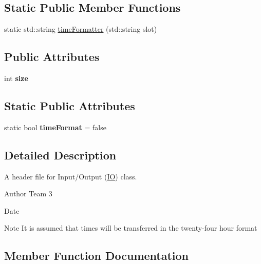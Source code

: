 \subsection*{Static Public Member Functions}
\begin{DoxyCompactItemize}
\item 
static std\+::string \hyperlink{classIO_ad78c42847c70915fe94bddd25f716859}{time\+Formatter} (std\+::string slot)
\end{DoxyCompactItemize}
\subsection*{Public Attributes}
\begin{DoxyCompactItemize}
\item 
int {\bfseries size}\hypertarget{classIO_a4e344c74454e6609b817e3fdb3fcddf3}{}\label{classIO_a4e344c74454e6609b817e3fdb3fcddf3}

\end{DoxyCompactItemize}
\subsection*{Static Public Attributes}
\begin{DoxyCompactItemize}
\item 
static bool {\bfseries time\+Format} = false\hypertarget{classIO_a04cf024687a6a86007db5ecfcab69e5c}{}\label{classIO_a04cf024687a6a86007db5ecfcab69e5c}

\end{DoxyCompactItemize}


\subsection{Detailed Description}
A header file for Input/\+Output (\hyperlink{classIO}{IO}) class. 

\begin{DoxyAuthor}{Author}
Team 3 
\end{DoxyAuthor}
\begin{DoxyDate}{Date}

\end{DoxyDate}
\begin{DoxyNote}{Note}
It is assumed that times will be transferred in the twenty-\/four hour format 
\end{DoxyNote}


\subsection{Member Function Documentation}
